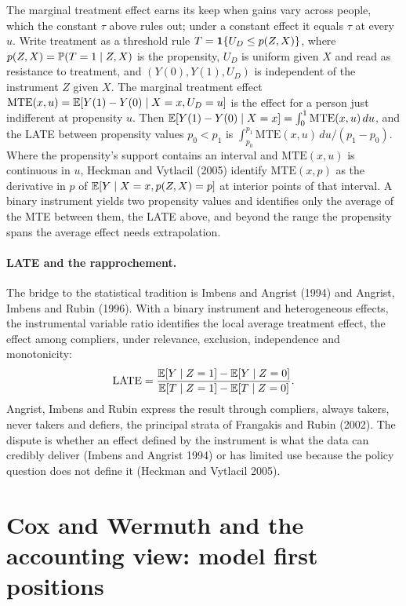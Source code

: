 The marginal treatment effect earns its keep when gains vary across people, which the constant $\tau$ above rules out; under a constant effect it equals $\tau$ at every $u$. Write treatment as a threshold rule $T=\mathbf{1}\{U_D\le p(Z,X)\}$, where $p(Z,X)=\mathbb{P}(T=1\mid Z,X)$ is the propensity, $U_D$ is uniform given $X$ and read as resistance to treatment, and $(Y(0),Y(1),U_D)$ is independent of the instrument $Z$ given $X$. The marginal treatment effect $\mathrm{MTE}(x,u)=\mathbb{E}[Y(1)-Y(0)\mid X=x,U_D=u]$ is the effect for a person just indifferent at propensity $u$. Then $\mathbb{E}[Y(1)-Y(0)\mid X=x]=\int_0^1\mathrm{MTE}(x,u)\,du$, and the LATE between propensity values $p_0<p_1$ is $\int_{p_0}^{p_1}\mathrm{MTE}(x,u)\,du/(p_1-p_0)$. Where the propensity's support contains an interval and $\mathrm{MTE}(x,u)$ is continuous in $u$, Heckman and Vytlacil (2005) identify $\mathrm{MTE}(x,p)$ as the derivative in $p$ of $\mathbb{E}[Y\mid X=x,p(Z,X)=p]$ at interior points of that interval. A binary instrument yields two propensity values and identifies only the average of the MTE between them, the LATE above, and beyond the range the propensity spans the average effect needs extrapolation.

\paragraph{LATE and the rapprochement.} The bridge to the statistical tradition is Imbens and Angrist (1994) and Angrist, Imbens and Rubin (1996). With a binary instrument and heterogeneous effects, the instrumental variable ratio identifies the local average treatment effect, the effect among compliers, under relevance, exclusion, independence and monotonicity:
\[
\mathrm{LATE} = \frac{\mathbb{E}[Y\mid Z=1]-\mathbb{E}[Y\mid Z=0]}{\mathbb{E}[T\mid Z=1]-\mathbb{E}[T\mid Z=0]} .
\]
Angrist, Imbens and Rubin express the result through compliers, always takers, never takers and defiers, the principal strata of Frangakis and Rubin (2002). The dispute is whether an effect defined by the instrument is what the data can credibly deliver (Imbens and Angrist 1994) or has limited use because the policy question does not define it (Heckman and Vytlacil 2005).

\section{Cox and Wermuth and the accounting view: model first positions}\label{fw:sec:cox}\label{fw:sec:accounting}

